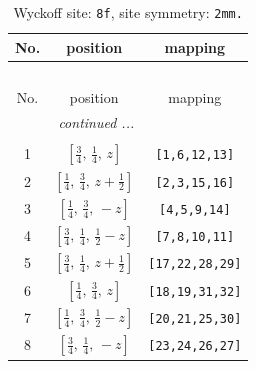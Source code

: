 \documentclass[fleqn,8pt]{jsarticle}
\begin{document}
\begin{longtable}{ccc}
\caption{Wyckoff site: {\tt 8f}, site symmetry: {\tt 2mm.}}
 \\
 \hline \hline
No. & position & mapping \\ \hline \endfirsthead

\multicolumn{2}{l}{\tablename\ \thetable{}} \\
 \hline \hline
No. & position & mapping \\ \hline \endhead

 \hline \hline
\multicolumn{2}{r}{\footnotesize\it continued ...} \\ \endfoot

 \hline \hline
\multicolumn{2}{r}{} \\ \endlastfoot

1 & $\left[ \frac{3}{4},\, \frac{1}{4},\, z \right]$ & {\tt [1,6,12,13]} \\ \hline
2 & $\left[ \frac{1}{4},\, \frac{3}{4},\, z + \frac{1}{2} \right]$ & {\tt [2,3,15,16]} \\ \hline
3 & $\left[ \frac{1}{4},\, \frac{3}{4},\, - z \right]$ & {\tt [4,5,9,14]} \\ \hline
4 & $\left[ \frac{3}{4},\, \frac{1}{4},\, \frac{1}{2} - z \right]$ & {\tt [7,8,10,11]} \\ \hline
5 & $\left[ \frac{3}{4},\, \frac{1}{4},\, z + \frac{1}{2} \right]$ & {\tt [17,22,28,29]} \\ \hline
6 & $\left[ \frac{1}{4},\, \frac{3}{4},\, z \right]$ & {\tt [18,19,31,32]} \\ \hline
7 & $\left[ \frac{1}{4},\, \frac{3}{4},\, \frac{1}{2} - z \right]$ & {\tt [20,21,25,30]} \\ \hline
8 & $\left[ \frac{3}{4},\, \frac{1}{4},\, - z \right]$ & {\tt [23,24,26,27]} \\
\end{longtable}
\renewcommand{\arraystretch}{1.2}
\end{document}
